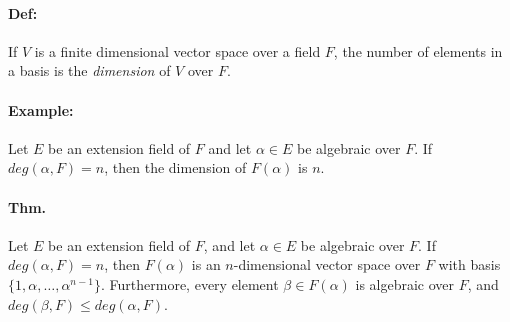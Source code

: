 \documentclass[10pt,a4paper]{article}
\begin{document}
\paragraph{Def:} If $V$ is a finite dimensional vector space over a field $F$, the number of elements in a basis is the \textit{dimension} of $V$ over $F$.

\paragraph{Example:} Let $E$ be an extension field of $F$ and let $\alpha \in E$ be algebraic over $F$. If $deg(\alpha, F) = n$, then the dimension of $F(\alpha)$ is $n$.

\paragraph{Thm.} Let $E$ be an extension field of $F$, and let $\alpha \in E$ be algebraic over $F$. If $deg(\alpha, F) =n$, then $F(\alpha)$ is an $n$-dimensional vector space over $F$ with basis $\{1, \alpha, \dots, \alpha^{n-1} \}$. Furthermore, every element $\beta \in F(\alpha)$ is algebraic over $F$, and $deg(\beta, F) \leq deg(\alpha, F)$. 
\end{document}
